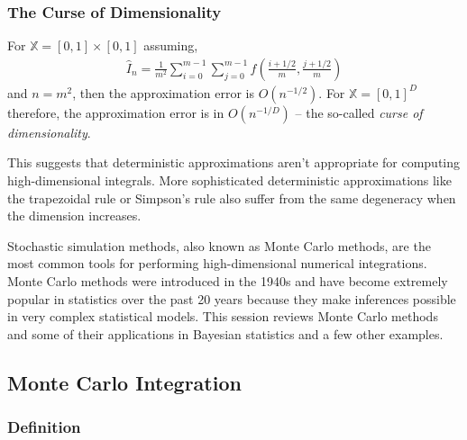 \subsubsection{The Curse of Dimensionality}

For \(\mathbb{X}=[0,1] \times [0,1]\)
assuming,
\begin{align}
{\widehat{I}}_{n} = 
\frac{1}{m^{2}}\sum_{i = 0}^{m - 1}{\sum_{j = 0}^{m - 1}{f\left( \frac{i + 1/2}{m},\frac{j + 1/2}{m} \right)}}
\end{align}
and \(n=m^{2}\), 
then the approximation error is \(O\left( n^{- 1/2} \right)\). 
For \(\mathbb{X}=[0,1]^{D}\) therefore, 
the approximation error is in \(O\left(n^{- 1/D} \right)\) 
-- the so-called \emph{curse of dimensionality}. 

This suggests that deterministic approximations
aren't appropriate for computing high-dimensional integrals. 
More sophisticated deterministic approximations like the trapezoidal 
rule or Simpson's rule also suffer 
from the same degeneracy when the dimension increases.

Stochastic simulation methods, 
also known as Monte Carlo methods, 
are the most common tools for performing 
high-dimensional numerical integrations. 
Monte Carlo methods were introduced in the 1940s and have
become extremely popular in statistics 
over the past 20 years because
they make inferences possible in very complex statistical models. 
This session reviews Monte Carlo methods 
and some of their applications in Bayesian statistics and a few other examples.

\subsection{Monte Carlo Integration} %

\subsubsection{Definition}


